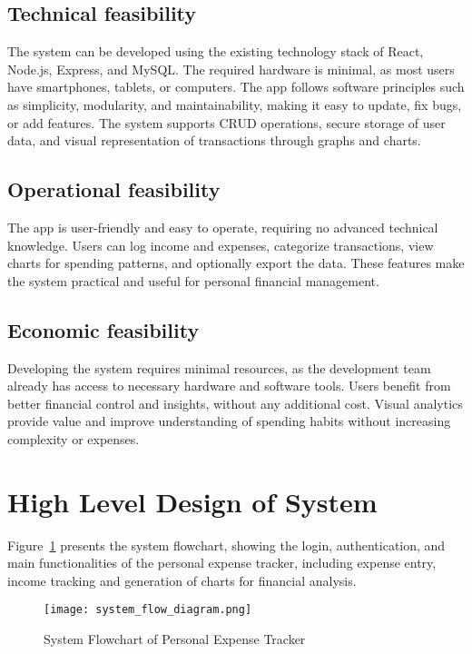 \documentclass[12pt]{report} %
\begin{document}
\subsection{Technical feasibility}
The system can be developed using the existing technology stack of React, Node.js, Express, and MySQL. The required hardware is minimal, as most users have smartphones, tablets, or computers. The app follows software principles such as simplicity, modularity, and maintainability, making it easy to update, fix bugs, or add features. The system supports CRUD operations, secure storage of user data, and visual representation of transactions through graphs and charts.

\subsection{Operational feasibility}
The app is user-friendly and easy to operate, requiring no advanced technical knowledge. Users can log income and expenses, categorize transactions, view charts for spending patterns, and optionally export the data. These features make the system practical and useful for personal financial management.

\subsection{Economic feasibility}
Developing the system requires minimal resources, as the development team already has access to necessary hardware and software tools. Users benefit from better financial control and insights, without any additional cost. Visual analytics provide value and improve understanding of spending habits without increasing complexity or expenses.

\newpage

\section{High Level Design of System}

Figure~\ref{fig:flowchart} presents the system flowchart, showing the login, authentication, and main functionalities of the personal expense tracker, including expense entry, income tracking and generation of charts for financial analysis.
\vspace{50pt}
\begin{figure}[h!]
    \centering
    \texttt{[image: system\_flow\_diagram.png]}
    \caption{System Flowchart of Personal Expense Tracker}
    \label{fig:flowchart}
\end{figure}
\end{document}
